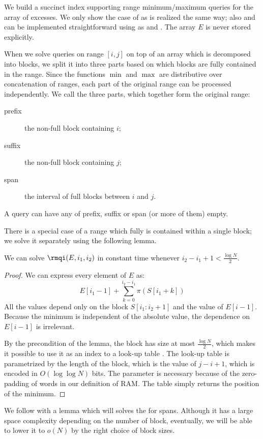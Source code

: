 We build a succinct index supporting range minimum/maximum queries for the array of excesses.
We only show the case of \rmqi{} as \RMQi{} is realized the same way; also \rmq{} and \RMQ{} can be implemented straightforward using \rmqi{} as \RMQi{} and \excess{}.
The array $E$ is never stored explicitly.

When we solve queries on range $[i, j]$ on top of an array which is decomposed into blocks, we split it into three parts based on which blocks are fully contained in the range.
Since the functions $\min$ and $\max$ are distributive over concatenation of ranges, each part of the original range can be processed independently.
We call the three parts, which together form the original range:
\begin{description}
	\item[prefix] the non-full block containing $i$;
	\item[suffix] the non-full block containing $j$;
	\item[span] the interval of full blocks between $i$ and $j$.
\end{description}
A query can have any of prefix, suffix or span (or more of them) empty.

There is a special case of a range which fully is contained within a single block; we solve it separately using the following lemma.
\begin{lemma}\label{lemma:rmq1}
	We can solve $\rmqi(E, i_1, i_2)$ in constant time whenever $i_2 - i_1 + 1 < \frac{\log N}{2}$.
\end{lemma}
\begin{proof}
	We can express every element of $E$ as:
	$$E[i_1 - 1] + \sum_{k = 0}^{i_2 - i_1} \pi(S[i_1 + k])$$
	All the values depend only on the block $S[i_1 : i_2 + 1]$ and the value of $E[i - 1]$.
	Because the minimum is independent of the absolute value, the dependence on $E[i - 1]$ is irrelevant.
	
	By the precondition of the lemma, the block has size at most $\frac{\log N}{2}$, which makes it possible to use it as an index to a look-up table \rmqi.
	The look-up table is parametrized by the length of the block, which is the value of $j - i + 1$, which is encoded in $O(\log \log N)$ bits.
	The parameter is necessary because of the zero-padding of words in our definition of RAM.
	The table simply returns the position of the minimum.
\end{proof}

\bigbreak

We follow with a lemma which will solves the \rmqi{} for spans.
Although it has a large space complexity depending on the number of block, eventually, we will be able to lower it to $o(N)$ by the right choice of block sizes.

